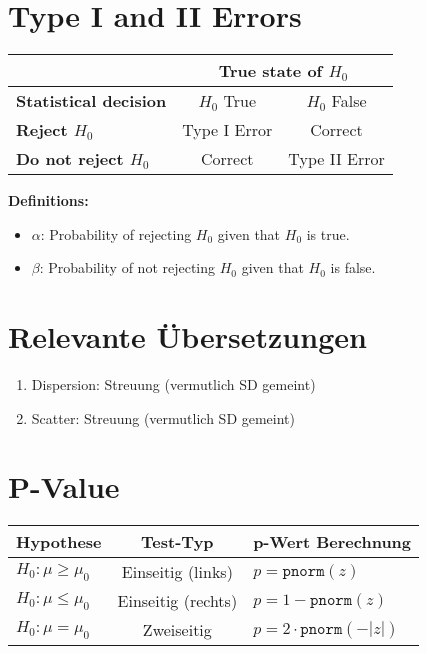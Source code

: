 
\section{Type I and II Errors}
\noindent
\begin{tabular}{|l|c|c|}
\hline
& \multicolumn{2}{c|}{\textbf{True state of } $H_0$}\\
\hline
\textbf{Statistical decision} & $H_0$ True & $H_0$ False\\
\hline
\textbf{Reject $H_0$} & Type I Error & Correct\\
\hline
\textbf{Do not reject $H_0$} & Correct & Type II Error\\
\hline
\end{tabular}

\textbf{Definitions:}
\begin{itemize}
    \item $\alpha$: Probability of rejecting $H_0$ given that $H_0$ is true.
    \item $\beta$: Probability of not rejecting $H_0$ given that $H_0$ is false.
\end{itemize}

\section{Relevante Übersetzungen}
\begin{enumerate}
    \item Dispersion: Streuung (vermutlich SD gemeint)
    \item Scatter: Streuung (vermutlich SD gemeint)
\end{enumerate}
\section{P-Value}
\noindent
\noindent
\begin{tabular}{lcl}
  \toprule
  \textbf{Hypothese}         & \textbf{Test-Typ}    & \textbf{p-Wert Berechnung} \\
  \midrule
  \(H_0: \mu \ge \mu_0\)      & Einseitig (links)   & \(p = \mathtt{pnorm}(z)\)   \\
  \(H_0: \mu \le \mu_0\)      & Einseitig (rechts)  & \(p = 1 - \mathtt{pnorm}(z)\) \\
  \(H_0: \mu = \mu_0\)        & Zweiseitig          & \(p = 2 \cdot \mathtt{pnorm}(-|z|)\) \\
  \bottomrule
\end{tabular}

\pagebreak




















